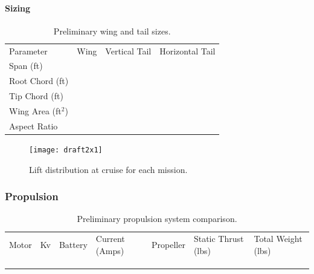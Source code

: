 \documentclass[report]{byu-aero}
\begin{document}
\paragraph{Sizing}


\begin{table}[h!]
	\centering
	\caption{Preliminary wing and tail sizes.}
	\label{tab:prelimwingsize}
	\begin{tabular}{ C{1in}  C{1in}  C{1in}  C{1in}}
		
		Parameter & Wing & Vertical Tail & Horizontal Tail \\
		
		Span (ft) & & &\\
		
		Root Chord (ft) & & &\\
		
		Tip Chord (ft) & & &\\
		
		Wing Area (ft\(^2\)) & & &\\
		
		Aspect Ratio & & &\\
		
	\end{tabular}
\end{table}


\begin{figure}[h!]
	\centering
	\texttt{[image: draft2x1]}
	\caption{Lift distribution at cruise for each mission.}
	\label{fig:prelimliftdist}
\end{figure}

\subsubsection{Propulsion}

\begin{table}[h!]
	\centering
	\caption{Preliminary propulsion system comparison.}
	\label{tab:prelimpropselection}
	\begin{tabular}{ C{1in}  C{0.25in}  C{1in}  C{0.5in}  C{0.75in}  C{0.75in}  C{0.75in}}
		
		Motor & Kv & Battery & Current (Amps) & Propeller & Static Thrust (lbs) & Total Weight (lbs) \\
		
		& & & & & & \\
		
		& & & & & & \\
		
		& & & & & & \\
		
	\end{tabular}
\end{table}
\end{document}
